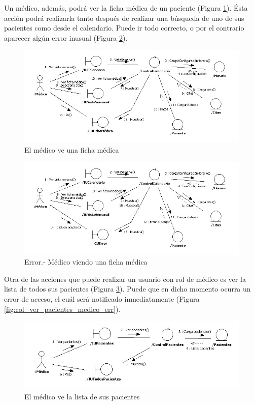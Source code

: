		Un médico, además, podrá ver la ficha médica de un paciente (Figura \ref{fig:col_verficha_medico}). Ésta acción podrá realizarla tanto después de realizar una búsqueda de uno de sus pacientes como desde el calendario. Puede ir todo correcto, o por el contrario aparecer algún error inusual (Figura \ref{fig:col_verficha_medico_err}).
		
		\begin{figure}[H]
		  \centering
		    \includegraphics[width=16cm]{img/jpg/colaboraciones/11_VerFichaMedica.jpg}
		  \caption{El médico ve una ficha médica}
		  \label{fig:col_verficha_medico}
		\end{figure}
		
		\begin{figure}[H]
		  \centering
		    \includegraphics[width=16cm]{img/jpg/colaboraciones/12_VerFichaMedicaError.jpg}
		  \caption{Error.- Médico viendo una ficha médica}
		  \label{fig:col_verficha_medico_err}
		\end{figure}
		
		Otra de las acciones que puede realizar un usuario con rol de médico es ver la lista de todos sus pacientes (Figura \ref{fig:col_ver_pacientes_medico}). Puede que en dicho momento ocurra un error de acceso, el cuál será notificado inmediatamente (Figura \ref{fig:col_ver_pacientes_medico_err}).
		
		\begin{figure}[H]
		  \centering
		    \includegraphics[width=16cm]{img/jpg/colaboraciones/13_VerTodosPacientes.jpg}
		  \caption{El médico ve la lista de sus pacientes}
		  \label{fig:col_ver_pacientes_medico}
		\end{figure}
		
